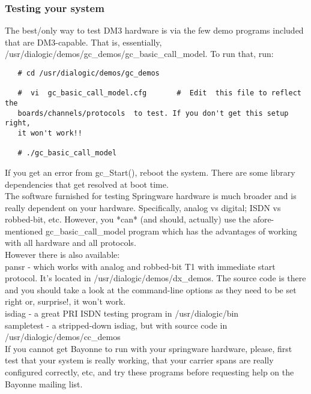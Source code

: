 \documentclass[a4paper,12pt]{article}
\begin{document}
\subsubsection{Testing your system}

The best/only way to test DM3 hardware is via the few demo programs
included that are DM3-capable.  That is, essentially,
/usr/dialogic/demos/gc\_demos/gc\_basic\_call\_model. To run that, run: \\

\begin{verbatim}
   # cd /usr/dialogic/demos/gc_demos

   #  vi  gc_basic_call_model.cfg       #  Edit  this file to reflect the
   boards/channels/protocols  to test. If you don't get this setup right,
   it won't work!!

   # ./gc_basic_call_model
\end{verbatim}

If you get an error from gc\_Start(), reboot the system. There are some
library dependencies that get resolved at boot time. \\

The software furnished for testing Springware hardware is much broader and
is really dependent on your hardware. Specifically, analog vs digital;
ISDN vs robbed-bit, etc.  However, you *can* (and should, actually)  use
the afore-mentioned gc\_basic\_call\_model program which has the
advantages of working with all hardware and all protocols. \\

However there is also available: \\

pansr - which works with analog and robbed-bit T1 with immediate start
protocol.  It's located in /usr/dialogic/demos/dx\_demos. The source code
is there and you should take a look at the command-line options as they
need to be set right or, surprise!, it won't work. \\

isdiag - a great PRI ISDN testing program in /usr/dialogic/bin \\

sampletest - a stripped-down isdiag, but with source code in
/usr/dialogic/demos/cc\_demos \\

If you cannot get Bayonne to run with your springware hardware, please,
first test that your system is really working, that your carrier spans are
really configured correctly, etc, and try these programs before requesting
help on the Bayonne mailing list. \\
\end{document}
